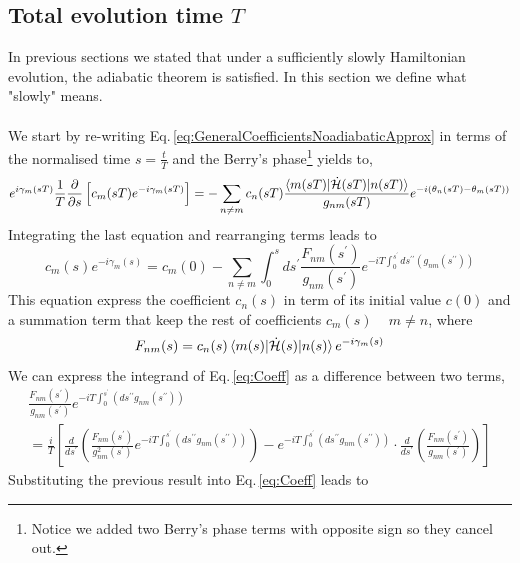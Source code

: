 \subsection{Total evolution time $T$}
In previous sections we stated that under a sufficiently slowly Hamiltonian evolution, the adiabatic theorem is satisfied. In this section we define what "slowly" means. \\\\
We start by re-writing Eq.\,\eqref{eq:GeneralCoefficientsNoadiabaticApprox} in terms of the normalised time $s = \frac{t}{T}$ and the Berry's phase\footnote{Notice we added two Berry's phase terms with opposite sign so they cancel out.} yields to,
\begin{equation}
    e^{i\gamma_{m}(sT)}\frac{1}{T}\frac{\partial }{\partial s}\left[c_{m}(sT)e^{-i\gamma_{m}(sT)}\right] = -\sum_{n\neq m} c_{n}(sT) \frac{\braket{m(sT)|\dot{\mathcal{H}}(sT)|n(sT)}}{g_{nm}(sT)}e^{-i\left(\theta_{n}(sT) - \theta_{m}(sT)\right)}
\end{equation}
Integrating the last equation and rearranging terms leads to
\begin{equation}
\label{eq:Coeff}
    c_{m}(s)e^{-i\gamma_{m}(s)} = c_{m}(0) - \sum_{n\neq m}\int_{0}^{s} ds^{\prime}\frac{F_{nm}(s^{\prime})}{g_{nm}(s^{\prime})}e^{-iT\int_{0}^{s^{\prime}}ds^{\prime\prime}\left(g_{nm}(s^{\prime\prime})\right)}
\end{equation}
This equation express the coefficient $c_{n}(s)$ in term of its initial value $c(0)$ and a summation term that keep the rest of coefficients $c_{m}(s)\, \quad m\neq n$, where
\begin{equation}
\label{eq:Fnm}
    F_{nm}(s) = c_{n}(s)\braket{m(s)|\dot{\mathcal{H}}(s)|n(s)} e^{-i\gamma_{m}(s)}
\end{equation}
We can express the integrand of Eq.\,\eqref{eq:Coeff} as a difference between two terms,
\begin{align}
\frac{F_{nm}(s^{\prime})}{g_{nm}(s^{\prime})} e^{-iT\int_{0}^{s^{\prime}}\left(ds^{\prime \prime}g_{nm}(s^{\prime\prime}) \right)} \\
= \frac{i}{T}\left[\frac{d}{ds^{\prime}}\left(\frac{F_{nm}(s^{\prime})}{g^{2}_{nm}(s^{\prime})}e^{-iT\int_{0}^{s^{\prime}}\left(ds^{\prime \prime}g_{nm}(s^{\prime\prime}) \right)}\right) - e^{-iT\int_{0}^{s^{\prime}}\left(ds^{\prime \prime}g_{nm}(s^{\prime\prime}) \right)} \cdot \frac{d}{ds^{\prime}}\left(\frac{F_{nm}(s^{\prime})}{g_{nm}(s^{\prime})}\right)\right] 
 \end{align}
 Substituting the previous result into Eq.\,\eqref{eq:Coeff} leads to
